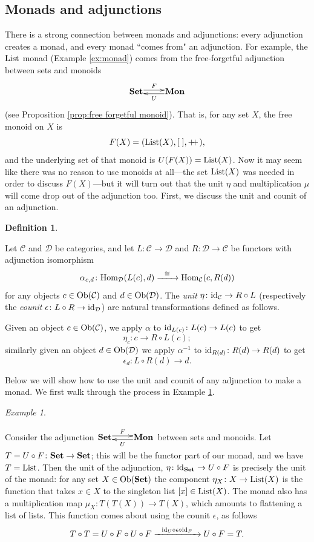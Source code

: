 \documentclass{book}
\makeatletter
\def\tn{\textnormal}
\def\mc{\mathcal}
\def\Hom{\tn{Hom}}
\def\List{\tn{List}}
\def\Ob{\tn{Ob}}
\def\to{\rightarrow}
\def\taking{\colon}
\def\iso{\cong}
\def\m1{{-1}}
\def\plpl{+\!\!+\hspace{1pt}}
\newcommand{\Too}[1]{\xrightarrow{\ \ #1\ \ }}
\newcommand{\Adjoint}[4]{\xymatrix@1{#2 \ar@<.5ex>[r]^-{#1} & #3 \ar@<.5ex>[l]^-{#4}}}
\def\id{\tn{id}}
\def\Mon{{\bf Mon}}
\def\Set{{\bf Set}}
\def\mcC{\mc{C}}
\def\mcD{\mc{D}}
\theoremstyle{remark}
\newtheorem{example}[subsubsection]{Example}
\theoremstyle{definition}
\newtheorem{definition}[subsubsection]{Definition}
\makeatother
\begin{document}

\subsection{Monads and adjunctions}

There is a strong connection between monads and adjunctions: every adjunction creates a monad, and every monad ``comes from" an adjunction. For example, the $\List$ monad (Example \ref{ex:monad}) comes from the free-forgetful adjunction between sets and monoids
$$\Adjoint{F}{\Set}{\Mon}{U}$$
(see Proposition \ref{prop:free forgetful monoid}). That is, for any set $X$, the free monoid on $X$ is $$F(X)=(\List(X),[\;],\plpl),$$ and the underlying set of that monoid is $U(F(X))=\List(X)$. Now it may seem like there was no reason to use monoids at all---the set $\List(X)$ was needed in order to discuss $F(X)$---but it will turn out that the unit $\eta$ and multiplication $\mu$ will come drop out of the adjunction too. First, we discuss the unit and counit of an adjunction.

\begin{definition}\label{def:unit and counit of adjunction}

Let $\mcC$ and $\mcD$ be categories, and let $L\taking\mcC\to\mcD$ and $R\taking\mcD\to\mcC$ be functors with adjunction isomorphism 
$$\alpha_{c,d}\taking\Hom_\mcD(L(c),d)\Too{\iso}\Hom_\mcC(c,R(d))$$
for any objects $c\in\Ob(\mcC)$ and $d\in\Ob(\mcD)$. The {\em unit} $\eta\taking\id_\mcC\to R\circ L$ (respectively the {\em counit} $\epsilon\taking L\circ R\to\id_\mcD$) are natural transformations defined as follows.

Given an object $c\in\Ob(\mcC)$, we apply $\alpha$ to $\id_{L(c)}\taking L(c)\to L(c)$ to get 
$$\eta_c\taking c\to R\circ L(c);$$ 
similarly given an object $d\in\Ob(\mcD)$ we apply $\alpha^\m1$ to $\id_{R(d)}\taking R(d)\to R(d)$ to get 
$$\epsilon_d\taking L\circ R(d)\to d.$$ 

\end{definition}

Below we will show how to use the unit and counit of any adjunction to make a monad. We first walk through the process in Example \ref{ex:list adjunction makes monad}.

\begin{example}\label{ex:list adjunction makes monad}

Consider the adjunction $\Adjoint{F}{\Set}{\Mon}{U}$ between sets and monoids. Let $T=U\circ F\taking\Set\to\Set$; this will be the functor part of our monad, and we have $T=\List$. Then the unit of the adjunction, $\eta\taking\id_\Set\to U\circ F$ is precisely the unit of the monad: for any set $X\in\Ob(\Set)$ the component $\eta_X\taking X\to\List(X)$ is the function that takes $x\in X$ to the singleton
list $[x]\in\List(X)$. The monad also has a multiplication map $\mu_X\taking T(T(X))\to T(X)$, which amounts to flattening a list of lists. This function comes about using the counit $\epsilon$, as follows 
$$T\circ T=U\circ F\circ U\circ F\Too{\id_U\diamond\epsilon\diamond \id_F}U\circ F=T.$$

\end{example}
\end{document}
